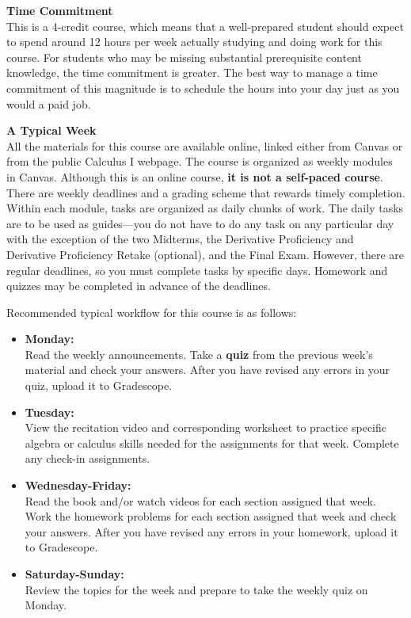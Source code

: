\documentclass[12pt]{article}
\renewcommand{\emph}[1]{\textsf{\textbf{#1}}}
\newcommand{\localhead}[1]{\par\smallskip\textbf{#1}\nobreak\\}%
\def\heading#1{\localhead{\large\emph{#1}}}
\begin{document}
\heading{Time Commitment}
This is a 4-credit course, which means that a well-prepared student should expect to spend around 12
hours per week actually studying and doing work for this course. For students who may be missing substantial
prerequisite content knowledge, the time commitment is greater. The best way to manage a time
commitment of this magnitude is to schedule the hours into your day just as you would a paid job.

\heading{A Typical Week}
All the materials for this course are available online, linked either from Canvas or from the public Calculus I webpage. The course is organized as weekly modules in Canvas. Although this is an online course, \emph{it is not a self-paced course}. There are weekly
deadlines and a grading scheme that rewards timely completion. Within each module, tasks are
organized as daily chunks of work. The daily tasks are to be used as guides---you do not have
to do any task on any particular day with the exception of the two Midterms, the Derivative Proficiency and Derivative Proficiency Retake (optional), and the
Final Exam. However, there are regular deadlines, so you must complete tasks by specific days. Homework and quizzes may be completed in advance of the deadlines. 

Recommended typical workflow for this course is as follows: 
\begin{itemize}
\item {\bf Monday:}\\
Read the weekly announcements. Take a {\bf quiz} from the previous week's material and check your answers. After you have revised any errors in your quiz, upload it to Gradescope.
\item {\bf Tuesday:}\\
View the recitation video and corresponding worksheet to practice specific algebra or calculus skills needed for the assignments for that week. Complete any check-in assignments.
\item {\bf Wednesday-Friday:}\\
Read the book and/or watch videos for each section assigned that week. Work the homework problems for each section assigned that week and check your answers. After you have revised any errors in your homework, upload it to Gradescope.
\item {\bf Saturday-Sunday:}\\
Review the topics for the week and prepare to take the weekly quiz on Monday.
\end{itemize}
\end{document}
